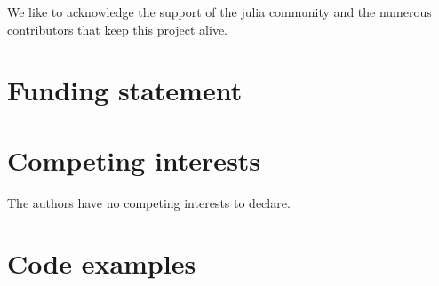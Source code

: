 \documentclass[a4paper]{article}
\begin{document}
We like to acknowledge the support of the julia community and the numerous contributors that keep this project alive.

\section*{Funding statement}


\section*{Competing interests}

The authors have no competing interests to declare.

\section*{Code examples}

\printbibliography
\end{document}
